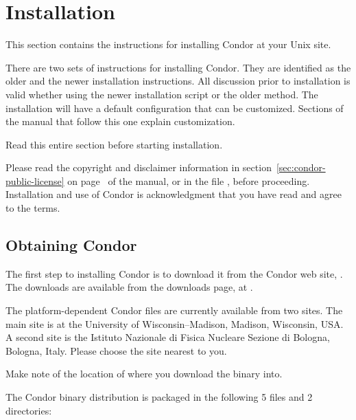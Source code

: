 \section{\label{sec:install}Installation}

This section contains the instructions for installing Condor at your
Unix site.

There are two sets of instructions for installing Condor.
They are identified as the older and the newer installation
instructions.
All discussion prior to installation is valid whether using
the newer installation script or the older method.
The installation will have a default configuration that can
be customized.
Sections of the manual that follow this one explain customization.

Read this entire section before starting installation.

Please read the copyright and disclaimer information in 
section~\ref{sec:condor-public-license} on
page~\pageref{sec:condor-public-license} of the manual, or in the
file , before proceeding.  Installation and
use of Condor is acknowledgment that you have read and agree to the
terms.

\subsection{\label{sec:pre-install-procedure}
Obtaining Condor}
The first step to installing Condor is to download it from the Condor
web site, .
The downloads are available from the downloads page,
at .

The platform-dependent Condor files are currently available from two sites.
The main site is at the University of Wisconsin--Madison,
Madison, Wisconsin, USA.
A second site is the Istituto Nazionale di Fisica Nucleare Sezione di
Bologna, Bologna, Italy.
Please choose the site nearest to you.

Make note of the location of where you download the binary into.

The Condor binary distribution is packaged in the following 5 files
and 2 directories:


